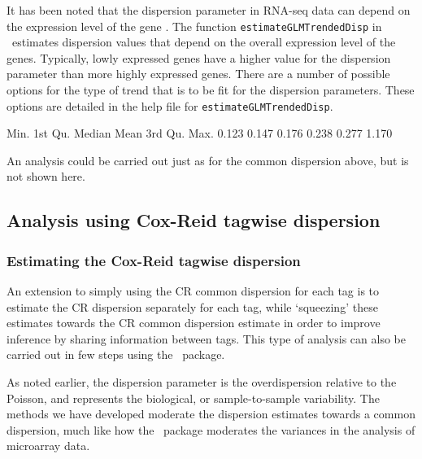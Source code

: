 It has been noted that the dispersion parameter in RNA-seq data can
depend on the expression level of the gene \citep{Anders:2010p792}. The
function \texttt{estimateGLMTrendedDisp} in \edgeR~estimates
dispersion values that depend on the overall expression level of the
genes. Typically, lowly expressed genes have a higher value for the
dispersion parameter than more highly expressed genes. There are a
number of possible options for the type of trend that is to be fit for
the dispersion parameters. These options are detailed in the help file
for \texttt{estimateGLMTrendedDisp}.

\begin{Schunk}
\begin{Soutput}
   Min. 1st Qu.  Median    Mean 3rd Qu.    Max. 
  0.123   0.147   0.176   0.238   0.277   1.170 
\end{Soutput}
\end{Schunk}

An analysis could be carried out just as for the common dispersion
above, but is not shown here.


\subsection{Analysis using Cox-Reid tagwise dispersion}


\subsubsection{Estimating the Cox-Reid tagwise dispersion}

An extension to simply using the CR common dispersion for each tag is
to estimate the CR dispersion separately for each tag, while
`squeezing' these estimates towards the CR common dispersion estimate
in order to improve inference by sharing information between
tags. This type of analysis can also be carried out in few steps using
the \edgeR~package.

As noted earlier, the dispersion parameter is the overdispersion
relative to the Poisson, and represents the biological, or
sample-to-sample variability. The methods we have developed moderate
the dispersion estimates towards a common dispersion, much like how
the \limma~package moderates the variances in the analysis of
microarray data.

